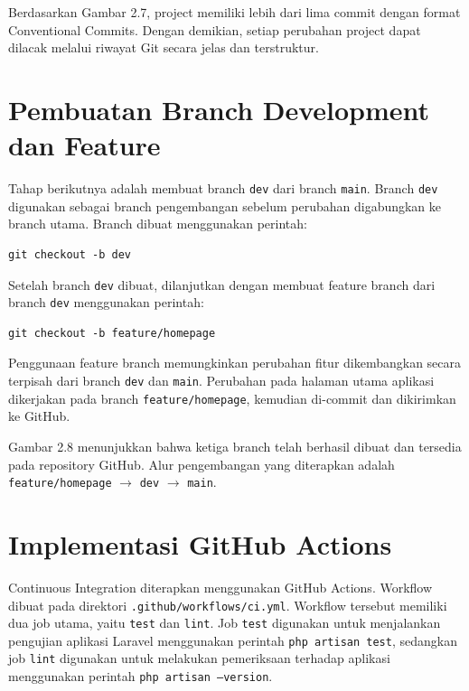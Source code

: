 Berdasarkan Gambar 2.7, project memiliki lebih dari lima commit dengan format Conventional Commits. Dengan demikian, setiap perubahan project dapat dilacak melalui riwayat Git secara jelas dan terstruktur.

\section{Pembuatan Branch Development dan Feature}

Tahap berikutnya adalah membuat branch \texttt{dev} dari branch \texttt{main}. Branch \texttt{dev} digunakan sebagai branch pengembangan sebelum perubahan digabungkan ke branch utama. Branch dibuat menggunakan perintah:

\begin{lstlisting}
git checkout -b dev
\end{lstlisting}

Setelah branch \texttt{dev} dibuat, dilanjutkan dengan membuat feature branch dari branch \texttt{dev} menggunakan perintah:

\begin{lstlisting}
git checkout -b feature/homepage
\end{lstlisting}

Penggunaan feature branch memungkinkan perubahan fitur dikembangkan secara terpisah dari branch \texttt{dev} dan \texttt{main}. Perubahan pada halaman utama aplikasi dikerjakan pada branch \texttt{feature/homepage}, kemudian di-commit dan dikirimkan ke GitHub.


Gambar 2.8 menunjukkan bahwa ketiga branch telah berhasil dibuat dan tersedia pada repository GitHub. Alur pengembangan yang diterapkan adalah \texttt{feature/homepage} $\rightarrow$ \texttt{dev} $\rightarrow$ \texttt{main}.

\section{Implementasi GitHub Actions}

Continuous Integration diterapkan menggunakan GitHub Actions. Workflow dibuat pada direktori \texttt{.github/workflows/ci.yml}. Workflow tersebut memiliki dua job utama, yaitu \texttt{test} dan \texttt{lint}. Job \texttt{test} digunakan untuk menjalankan pengujian aplikasi Laravel menggunakan perintah \texttt{php artisan test}, sedangkan job \texttt{lint} digunakan untuk melakukan pemeriksaan terhadap aplikasi menggunakan perintah \texttt{php artisan --version}.

